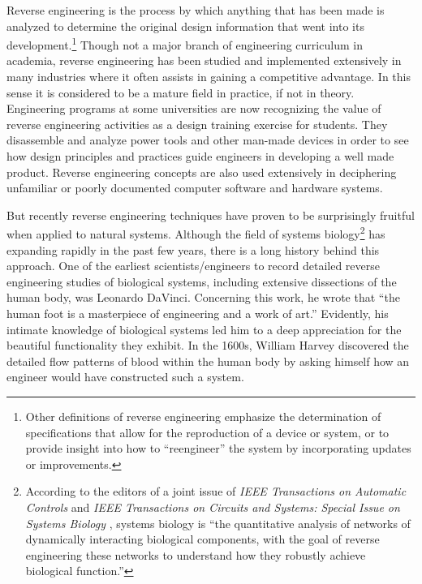 Reverse engineering is the process by which anything that has been made
is analyzed to determine the original design information that went into
its development.\footnote{
Other definitions of reverse engineering emphasize
the determination of specifications that allow for the reproduction of
a device or system, or to provide insight into how to “reengineer” the
system by incorporating updates or improvements.
} Though not a major branch of
engineering curriculum in academia, reverse engineering has been
studied and implemented extensively in many industries where it often
assists in gaining a competitive advantage. In this sense it is
considered to be a mature field in practice, if not in theory.
Engineering programs at some universities are now recognizing the value
of reverse engineering activities as a design training exercise for
students.\citep[][pgs. 57--59]{wu2008}
They disassemble and analyze power tools
and other man-made devices in order to see how design principles and
practices guide engineers in developing a well made product. Reverse
engineering concepts are also used extensively in deciphering
unfamiliar or poorly documented computer software and hardware
systems.\citep{eilam2005}

But recently reverse engineering techniques have proven to be
surprisingly fruitful when applied to natural systems. Although the
field of systems biology\footnote{
According to the editors of a joint issue of
\textit{IEEE Transactions on Automatic Controls} and \textit{IEEE
Transactions on Circuits and Systems: Special Issue on Systems Biology
}, systems biology is “the quantitative analysis of
networks of dynamically interacting biological components, with the
goal of reverse engineering these networks to understand how they
robustly achieve biological function.”\citep[][pg. 4]{joint2008}
} has expanding rapidly in
the past few years, there is a long history behind this approach. One
of the earliest scientists/engineers to record detailed reverse
engineering studies of biological systems, including extensive
dissections of the human body, was Leonardo DaVinci. Concerning this
work, he wrote that “the human foot is a masterpiece of engineering and
a work of art.” Evidently, his intimate knowledge of biological systems
led him to a deep appreciation for the beautiful functionality they
exhibit. In the 1600s, William Harvey discovered the detailed flow
patterns of blood within the human body by asking himself how an
engineer would have constructed such a system.\citep{auffraynoble2009}

